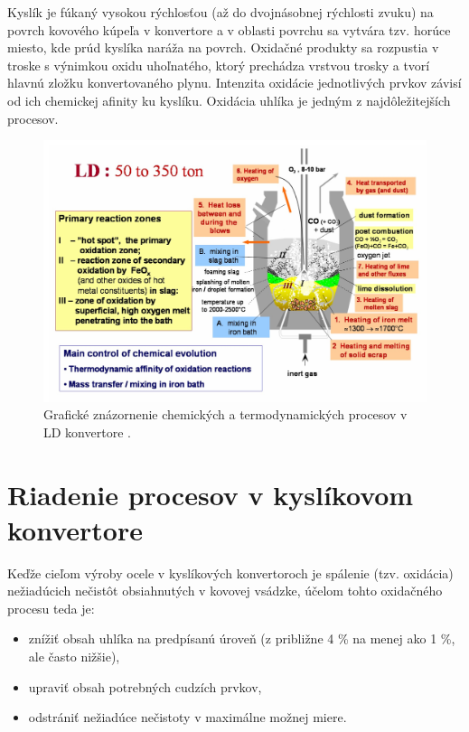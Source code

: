 \documentclass[]{tukediphc}
\begin{document}
Kyslík je fúkaný vysokou rýchlosťou (až do dvojnásobnej rýchlosti zvuku) na povrch kovového kúpeľa v konvertore a v oblasti povrchu sa vytvára tzv. horúce miesto, kde prúd kyslíka naráža na povrch. Oxidačné produkty sa rozpustia v troske s výnimkou oxidu uhoľnatého, ktorý prechádza vrstvou trosky a tvorí hlavnú zložku konvertovaného plynu. Intenzita oxidácie jednotlivých prvkov závisí od ich chemickej afinity ku kyslíku. Oxidácia uhlíka je jedným z najdôležitejších procesov.

\begin{figure}[h!]
	\centering
	\includegraphics[width=1\textwidth,angle=0]{figures/ld-convertor-processes-graphical.jpg}
	\caption{Grafické znázornenie chemických a termodynamických procesov v LD konvertore \citep{Jalkanen2006}.}
\end{figure}

\section{Riadenie procesov v kyslíkovom konvertore}

Keďže cieľom výroby ocele v kyslíkových konvertoroch je spálenie (tzv. oxidácia) nežiadúcich nečistôt obsiahnutých v kovovej vsádzke, účelom tohto oxidačného procesu teda je:

\begin{itemize}
	\item znížiť obsah uhlíka na predpísanú úroveň (z približne 4 \% na menej ako 1 \%, ale často nižšie),
	\item upraviť obsah potrebných cudzích prvkov,
	\item odstrániť nežiadúce nečistoty v maximálne možnej miere.
\end{itemize}
\end{document}
